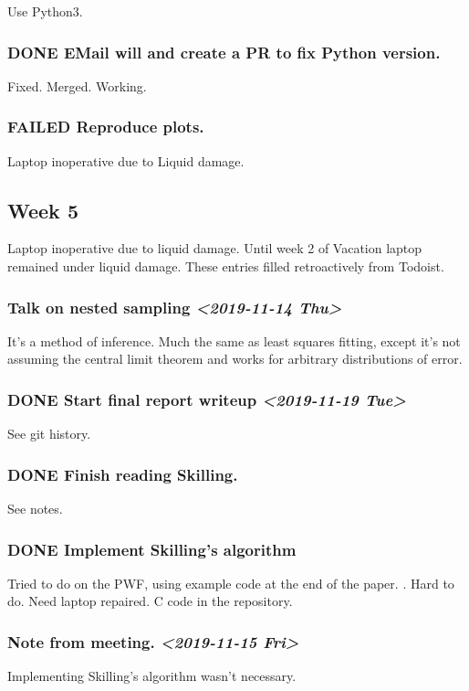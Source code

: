\documentclass[11pt]{article}
\begin{document}
Use Python3. 
\subsubsection{{\bfseries\sffamily DONE} EMail will and create a PR to fix Python version.}
\label{sec:orgf685e42}
Fixed. Merged. Working. 
\subsubsection{FAILED Reproduce plots.}
\label{sec:org196d9dc}
Laptop inoperative due to Liquid damage. 
\subsection{Week 5}
\label{sec:orgcd7f54f}
Laptop inoperative due to liquid damage.  Until week 2 of Vacation
laptop remained under liquid damage. These entries filled
retroactively from Todoist.
\subsubsection{Talk on nested sampling \textit{<2019-11-14 Thu>}}
\label{sec:orgca05365}
It's a method of inference. Much the same as least squares
fitting, except it's not assuming the central limit theorem and
works for arbitrary distributions of error.


\subsubsection{{\bfseries\sffamily DONE} Start final report writeup \textit{<2019-11-19 Tue>}}
\label{sec:org8e23cd7}
See git history. 
\subsubsection{{\bfseries\sffamily DONE} Finish reading Skilling.}
\label{sec:org0ba74d9}
See notes. 
\subsubsection{{\bfseries\sffamily DONE} Implement Skilling's algorithm}
\label{sec:org04074f5}
Tried to do on the PWF, using example code at the end of the paper. \cite{skilling}. 
Hard to do. Need laptop repaired. C code in the repository.
\subsubsection{Note from meeting. \textit{<2019-11-15 Fri>}}
\label{sec:orge52c6d4}
Implementing Skilling's algorithm wasn't necessary. 
\end{document}
